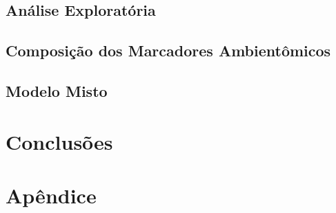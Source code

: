 \documentclass[12pt, a4paper, twoside]{report}
\numberwithin{equation}{subsection} %
\begin{document}
\section{Análise Exploratória}

\section{Composição dos Marcadores Ambientômicos}

\section{Modelo Misto}

\chapter{Conclusões}



\newpage





\chapter*{\textbf{Apêndice}}


\end{document}
